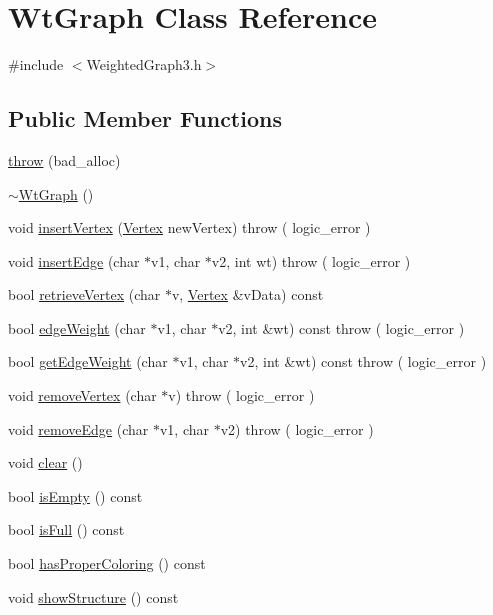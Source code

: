 \hypertarget{class_wt_graph}{\section{Wt\-Graph Class Reference}
\label{class_wt_graph}
}


{\ttfamily \#include $<$Weighted\-Graph3.\-h$>$}

\subsection*{Public Member Functions}
\begin{DoxyCompactItemize}
\item 
\hyperlink{class_wt_graph_aedc12a7f7377e58a6f58d5325ea1d828}{throw} (bad\-\_\-alloc)
\item 
\hyperlink{class_wt_graph_aa03cf442d9dfb33e3d0511d68b4d2a3a}{$\sim$\-Wt\-Graph} ()
\item 
void \hyperlink{class_wt_graph_a4ca3eb343548c81ca24fef7de7536437}{insert\-Vertex} (\hyperlink{class_vertex}{Vertex} new\-Vertex)  throw ( logic\-\_\-error )
\item 
void \hyperlink{class_wt_graph_aea0e33832423083bd5d532dc04ca1dff}{insert\-Edge} (char $\ast$v1, char $\ast$v2, int wt)  throw ( logic\-\_\-error )
\item 
bool \hyperlink{class_wt_graph_aee1b743d73b67a832e30c8603c9f2a0e}{retrieve\-Vertex} (char $\ast$v, \hyperlink{class_vertex}{Vertex} \&v\-Data) const 
\item 
bool \hyperlink{class_wt_graph_ac20ca5b112adb5403f50caf99e4ee8bd}{edge\-Weight} (char $\ast$v1, char $\ast$v2, int \&wt) const   throw ( logic\-\_\-error )
\item 
bool \hyperlink{class_wt_graph_afa768b2bfd49e68c1970e479cab00036}{get\-Edge\-Weight} (char $\ast$v1, char $\ast$v2, int \&wt) const   throw ( logic\-\_\-error )
\item 
void \hyperlink{class_wt_graph_aaabd4ba894d1c4251479837b1d0a0a78}{remove\-Vertex} (char $\ast$v)  throw ( logic\-\_\-error )
\item 
void \hyperlink{class_wt_graph_a7a1e566285ce7faefd211ba0d9ffa864}{remove\-Edge} (char $\ast$v1, char $\ast$v2)  throw ( logic\-\_\-error )
\item 
void \hyperlink{class_wt_graph_ad73f37d58e6e5132fbf6191b35e54e4e}{clear} ()
\item 
bool \hyperlink{class_wt_graph_ad521755a01e89cfd9e6cb4f3f0b8393b}{is\-Empty} () const 
\item 
bool \hyperlink{class_wt_graph_a2afac3672a8dd457da6dccc899e0a7f9}{is\-Full} () const 
\item 
bool \hyperlink{class_wt_graph_aad6215139213038e86eb7da9a3d6d2e6}{has\-Proper\-Coloring} () const 
\item 
void \hyperlink{class_wt_graph_aff09483a06de871dab7be3b5fb6a9f51}{show\-Structure} () const 
\end{DoxyCompactItemize}


